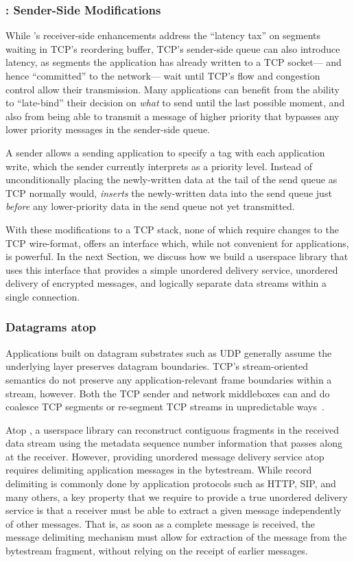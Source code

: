 \subsubsection{\utcp: Sender-Side Modifications}
While \utcp's receiver-side enhancements
address the ``latency tax''
on segments waiting in TCP's reordering buffer,
TCP's sender-side queue can also introduce latency,
as segments the application has already written to a TCP socket---%
and hence ``committed'' to the network---%
wait until TCP's flow and congestion control
allow their transmission.
Many applications can benefit from the ability to ``late-bind''
their decision on {\em what} to send until the last possible moment,
and also from being able to transmit a message of higher priority
that bypasses any lower priority messages in the sender-side queue.

A \utcp sender allows a sending application
to specify a tag with each application write,
which the \utcp sender currently
interprets as a priority level.
Instead of unconditionally placing the newly-written data
at the tail of the send queue as TCP normally would,
\utcp{} {\em inserts} the newly-written data into the send queue
just {\em before} any lower-priority data
in the send queue not yet transmitted.

With these modifications to a TCP stack,
none of which require changes to the TCP wire-format,
\utcp offers an interface which,
while not convenient for applications, 
is powerful.
In the next Section,
we discuss how we build a userspace library that uses this interface
that provides a simple unordered delivery service,
unordered delivery of encrypted messages,
and logically separate data streams 
within a single \utcp connection.

\subsubsection{Datagrams atop \utcp}
\label{sec:dgrams_utcp}

Applications built on datagram substrates such as UDP
generally assume the underlying layer preserves datagram boundaries.
TCP's stream-oriented semantics do not preserve
any application-relevant frame boundaries within a stream, however.
Both the TCP sender and network middleboxes can and do
coalesce TCP segments or re-segment TCP streams
in unpredictable ways~\cite{honda2011still}.

Atop \utcp,
a userspace library can reconstruct contiguous fragments 
in the received data stream
using the metadata sequence number information 
that \utcp passes along at the receiver.
However,
providing unordered message delivery service atop \utcp
requires delimiting application messages in the bytestream.
While record delimiting is commonly done
by application protocols such as HTTP, SIP, and many others,
a key property that we require to provide a true unordered delivery service
is that a receiver must be able to extract a given message 
independently of other messages.
That is, 
as soon as a complete message is received,
the message delimiting mechanism must
allow for extraction of the message from the bytestream fragment,
without relying on the receipt of earlier messages.

